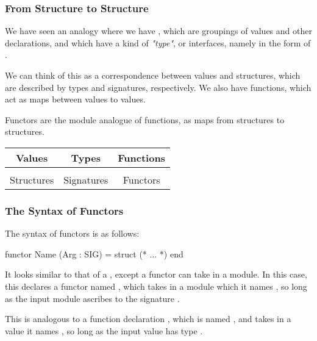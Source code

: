 \documentclass[aspectratio=169, handout]{beamer}
\begin{document}

\begin{frame}[fragile]
  \frametitle{From Structure to Structure}

  We have seen an analogy where we have , which are groupings
  of values and other declarations, and which have a kind of \textit{"type"}, or
  interfaces, namely in the form of .

  \pause
  \vspace{\fill}

  We can think of this as a correspondence between values and structures, which
  are described by types and signatures, respectively. We also have functions,
  which act as maps between values to values.

  \pause
  \vspace{\fill}

  Functors are the module analogue of functions, as maps from structures to structures.

  \vspace{\fill}

  \begin{center}
    \begin{tabular}{ c|c|c }
    Values & Types & Functions \\ [0.5ex]
    \hline & \\[-1.5ex]
    Structures & Signatures & Functors
    \end{tabular}
  \end{center}
\end{frame}

\begin{frame}[fragile]
  \frametitle{The Syntax of Functors}

  The syntax of functors is as follows:

  \begin{codeblock}
    functor Name (Arg : SIG) =
      struct
        (* ... *)
      end
  \end{codeblock}

  \pause
  \vspace{\fill}

  It looks similar to that of a , except a functor can take in
  a module. In this case, this declares a functor named , which takes
  in a module which it names , so long as the input module ascribes to
  the signature .

  \pause
  \vspace{\fill}

  This is analogous to a function declaration , which is named , and takes in a value it names ,
  so long as the input value has type .
\end{frame}
\end{document}
